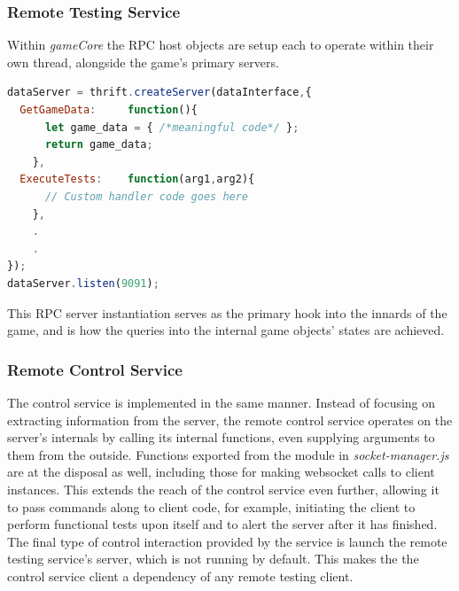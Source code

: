 \documentclass[conference]{IEEEtran}
\begin{document}
\subsubsection{Remote Testing Service}
Within \textit{gameCore} the RPC host objects are setup each to operate within their own thread, alongside the game's primary servers.

\begin{lstlisting}[language=JavaScript,caption={In this example, the thrift is used to create a server for the  'dataInterface' service. It then lists two skeleton functions to handle 'GetGameData' and 'ExecuteTests' functions.}]
dataServer = thrift.createServer(dataInterface,{
  GetGameData:     function(){
      let game_data = { /*meaningful code*/ };
      return game_data;
    },
  ExecuteTests:    function(arg1,arg2){
      // Custom handler code goes here
    },
    .
    .
});
dataServer.listen(9091);
\end{lstlisting}
This RPC server instantiation serves as the primary hook into the innards of the game, and is how the queries into the internal game objects' states are achieved.

\subsubsection{Remote Control Service}
The control service is implemented in the same manner. Instead of focusing on extracting information from the server, the remote control service operates on the server's internals by calling its internal functions, even supplying arguments to them from the outside. Functions exported from the module in \textit{socket-manager.js} are at the disposal as well, including those for making websocket calls to client instances. This extends the reach of the control service even further, allowing it to pass commands along to client code, for example, initiating the client to perform functional tests upon itself and to alert the server after it has finished. The final type of control interaction provided by the service is launch the remote testing service's server, which is not running by default. This makes the the control service client a dependency of any remote testing client.
\end{document}
